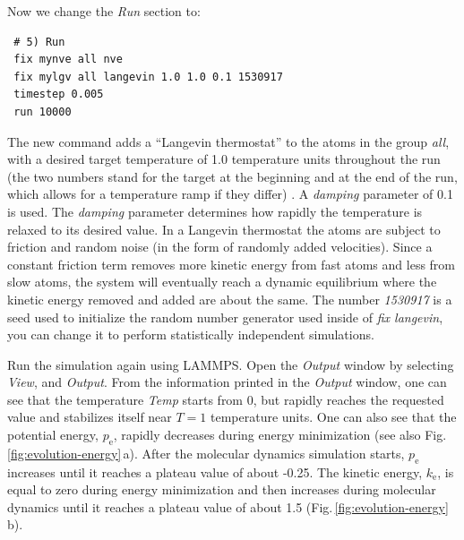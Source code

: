 \documentclass[9pt,tutorial]{livecoms}
\begin{document}
Now we change the \textit{Run} section to:
\begin{lstlisting}
 # 5) Run
 fix mynve all nve
 fix mylgv all langevin 1.0 1.0 0.1 1530917
 timestep 0.005
 run 10000
\end{lstlisting}

The new command adds a ``Langevin thermostat'' to the atoms in the group
\textit{all}, with a desired target temperature of 1.0 temperature units
throughout the run (the two numbers stand for the target at the beginning
and at the end of the run, which allows for a temperature ramp if
they differ) \cite{schneider1978molecular}.  A \textit{damping}
parameter of 0.1 is used.  The \textit{damping} parameter determines how
rapidly the temperature is relaxed to its desired value.  In a Langevin
thermostat the atoms are subject to friction and random noise (in the form
of randomly added velocities).  Since a constant friction term removes
more kinetic energy from fast atoms and less from slow atoms, the system
will eventually reach a dynamic equilibrium where the kinetic energy
removed and added are about the same.  The number \textit{1530917} is a
seed used to initialize the random number generator used inside of
\textit{fix langevin}, you can change it to perform statistically
independent simulations.

Run the simulation again using LAMMPS. Open the \textit{Output} window
by selecting \textit{View}, and \textit{Output}. From the information
printed in the \textit{Output} window, one can see that the temperature
\textit{Temp} starts from 0, but rapidly reaches the requested value and
stabilizes itself near $T=1$ temperature units.  One can also see that
the potential energy, $p_\text{e}$, rapidly decreases during energy
minimization (see also Fig.\,\ref{fig:evolution-energy}\,a). After
the molecular dynamics simulation starts, $p_\text{e}$ increases until
it reaches a plateau value of about -0.25. The kinetic energy,
$k_\text{e}$, is equal to zero during energy minimization and then
increases during molecular dynamics until it reaches a plateau value of
about 1.5 (Fig.\,\ref{fig:evolution-energy}\,b).
\end{document}
